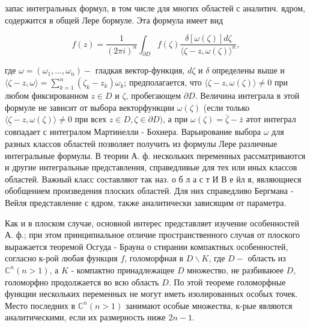 \documentclass[10pt]{article}
\begin{document}
запас интегральных формул, в том числе для многих областей с аналитич. ядром, содержится в общей Лере бормуле. Эта формула имеет вид



\[

f(z)=\frac{1}{(2 \pi i)^{n}} \int_{\partial D} f(\zeta) \frac{\delta[\omega(\zeta)] d \zeta}{\langle\zeta-z, \omega(\zeta)\rangle^{n}},

\]



где $\omega=\left(\omega_{1}, \ldots, \omega_{n}\right)-$ гладкая вектор-функция, $d \zeta$ и $\delta$ определены выше и $\langle\zeta-z, \omega\rangle=\sum_{k=1}^{n}\left(\zeta_{k}-z_{k}\right) \omega_{k}$; предполагается, что $\langle\zeta-z, \omega(\zeta)\rangle \neq 0$ при любом фиксированном $z \in D$ и $\zeta$, пробегающем $\partial D$. Величина интеграла в этой формуле не зависит от выбора векторфункции $\omega(\zeta)$ (если только $\langle\underline{\zeta}-z, \omega(\zeta)\rangle \neq 0$ при всех $z \in D, \zeta \in \partial D)$, а при $\omega(\zeta)=\bar{\zeta}-\bar{z}$ әтот интеграл совпадает с интегралом Мартинелли - Бохнера. Варьирование выбора $\omega$ для разных классов областей позволяет получить из формулы Лере различные интегральные формулы. В теории А. ф. нескольких переменных рассматриваются и другие интегральные представления, справедливые для тех или иных классов областей. Важный класс составляют так наз. о б л а с т И В е йл я, являющиеся обобщением произведения плоских областей. Для них справедливо Бергмана - Вейля представление с ядром, также аналитически зависящим от параметра.



Как и в плоском случае, основной интерес представляет изучение особенностей А. ф.; при этом принципиальное отличие пространственного случая от плоского выражается теоремой Осгуда - Брауна о стирании компактных особенностей, согласно к-рой любая функция $f$, голоморфная в $D \backslash K$, где $D-$ область из $\mathbb{C}^{n}(n>1)$, а $K$ - компактно принадлежащее $D$ множество, не разбиваюее $D$, голоморфно продолжается во всю область $D$. По этой теореме голоморфные функции нескольких переменных не могут иметь изолированных особых точек. Место последних в $\mathbb{C}^{n}(n>1)$ занимают особые множества, к-рые являются аналитическими, если их размерность ниже $2 n-1$.
\end{document}
